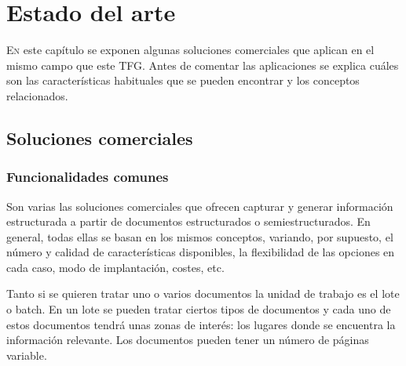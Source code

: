 
\chapter{Estado del arte}
\label{chap:estado-arte}

\lettrine{E}{n} este capítulo se exponen algunas soluciones comerciales que aplican en el mismo campo que este TFG. Antes de comentar las aplicaciones se explica cuáles son las características habituales que se pueden encontrar y los conceptos relacionados.

\section{Soluciones comerciales}

\subsection{Funcionalidades comunes}

Son varias las soluciones comerciales que ofrecen capturar y generar información estructurada a partir de documentos estructurados o semiestructurados. En general, todas ellas se basan en los mismos conceptos, variando, por supuesto, el número y calidad de características disponibles, la flexibilidad de las opciones en cada caso, modo de implantación, costes, etc.

Tanto si se quieren tratar uno o varios documentos la unidad de trabajo es el lote o batch. En un lote se pueden tratar ciertos tipos de documentos y cada uno de estos documentos tendrá unas zonas de interés: los lugares donde se encuentra la información relevante. Los documentos pueden tener un número de páginas variable.

